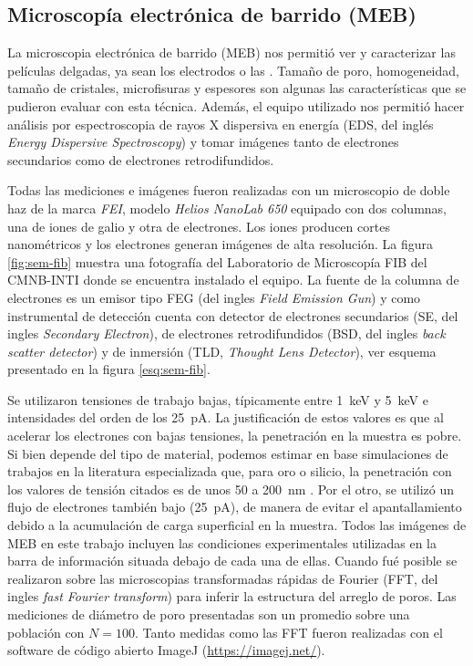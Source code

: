 	\subsection{Microscopía electrónica de barrido (MEB)}\label{sec:SEM}

		La microscopia electrónica de barrido (MEB) nos permitió ver y caracterizar las películas delgadas, ya sean los electrodos o las \pdm. Tamaño de poro, homogeneidad, tamaño de cristales, microfisuras y espesores son algunas las características que se pudieron evaluar con esta técnica. Además, el equipo utilizado nos permitió hacer análisis por espectroscopia de rayos X dispersiva en energía (EDS, del inglés \textit{Energy Dispersive Spectroscopy}) y tomar imágenes tanto de electrones secundarios como de electrones retrodifundidos. \cite{Goodhew2000,Watt1997}

		Todas las mediciones e imágenes fueron realizadas con un microscopio de doble haz de la marca \textit{FEI}, modelo \textit{Helios NanoLab 650} equipado con dos columnas, una de iones de galio y otra de electrones. Los iones producen cortes nanométricos y los electrones generan imágenes de alta resolución. La figura \ref{fig:sem-fib} muestra una fotografía del Laboratorio de Microscopía FIB del CMNB-INTI donde se encuentra instalado el equipo. La fuente de la columna de electrones es un emisor tipo FEG (del ingles \textit{Field Emission Gun}) y como instrumental de detección cuenta con detector de electrones secundarios (SE, del ingles \textit{Secondary Electron}), de electrones retrodifundidos (BSD, del ingles \textit{back scatter detector}) y de inmersión (TLD, \textit{Thought Lens Detector}), ver esquema presentado en la figura \ref{esq:sem-fib}. 

		Se utilizaron tensiones de trabajo bajas, típicamente entre \SI{1}{\kilo\electronvolt} y \SI{5}{\kilo\electronvolt} e intensidades del orden de los \SI{25}{\pA}. La justificación de estos valores es que al acelerar los electrones con bajas tensiones, la penetración en la muestra es pobre. Si bien depende del tipo de material, podemos estimar en base simulaciones de trabajos en la literatura especializada que, para oro o silicio, la penetración con los valores de tensión citados es de unos 50 a \SI{200}{\nm} \cite{Joy1984,Shur2012,Hafner2007}. Por el otro, se utilizó un flujo de electrones también bajo (\SI{25}{\pA}), de manera de evitar el apantallamiento debido a la acumulación de carga superficial en la muestra. Todos las imágenes de MEB en este trabajo incluyen las condiciones experimentales utilizadas en la barra de información situada debajo de cada una de ellas. Cuando fué posible se realizaron sobre las microscopias transformadas rápidas de Fourier (FFT, del ingles \textit{fast Fourier transform}) para inferir la estructura del arreglo de poros. Las mediciones de diámetro de poro presentadas son un promedio sobre una población con $N=100$. Tanto  medidas como las FFT fueron realizadas con el software de código abierto ImageJ (\url{https://imagej.net/})\cite{ImageJ2012}.	

